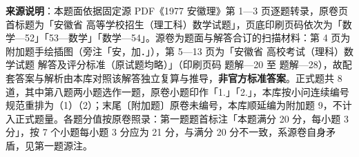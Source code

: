 


\begin{gktip}
\textbf{来源说明}：本题面依据固定源 PDF《1977 安徽理》第 1—3 页逐题转录，原卷页首标题为「安徽省 高等学校招生（理工科）数学试题」，页底印刷页码依次为「数学—52」「53—数学」「数学—54」。源卷为题面与解答合订的扫描材料：第 4 页为附加题手绘插图（旁注「安，加．」），第 5—13 页为「安徽省 高校考试（理科）数学试题 解答及评分标准（原试题均略）」（印刷页码 题解—20 至 题解—28），故配套答案与解析由本库对照该解答独立复算与推导，\textbf{非官方标准答案}。正式题共 8 道，其中第八题两小题选作一题，原卷小题印作「1.」「2.」，本库按小问连续编号规范重排为（1）（2）；末尾〔附加题〕原卷未编号，本库顺延编为附加题 9，不计入正式题量。各题分值按原卷照录：第一题题首标注「本题满分 20 分，每小题 3 分」，按 7 个小题每小题 3 分应为 21 分，与满分 20 分不一致，系源卷自身矛盾，见第一题源注。
\end{gktip}

